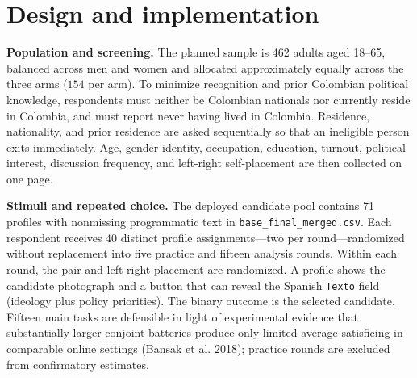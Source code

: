 \documentclass[10pt]{article}
\begin{document}
\section{Design and implementation}

\textbf{Population and screening.} The planned sample is 462 adults aged 18--65, balanced across men and women and allocated approximately equally across the three arms ($154$ per arm). To minimize recognition and prior Colombian political knowledge, respondents must neither be Colombian nationals nor currently reside in Colombia, and must report never having lived in Colombia. Residence, nationality, and prior residence are asked sequentially so that an ineligible person exits immediately. Age, gender identity, occupation, education, turnout, political interest, discussion frequency, and left-right self-placement are then collected on one page.

\textbf{Stimuli and repeated choice.} The deployed candidate pool contains 71 profiles with nonmissing programmatic text in \texttt{base\_final\_merged.csv}. Each respondent receives 40 distinct profile assignments---two per round---randomized without replacement into five practice and fifteen analysis rounds. Within each round, the pair and left-right placement are randomized. A profile shows the candidate photograph and a button that can reveal the Spanish \texttt{Texto} field (ideology plus policy priorities). The binary outcome is the selected candidate. Fifteen main tasks are defensible in light of experimental evidence that substantially larger conjoint batteries produce only limited average satisficing in comparable online settings (Bansak et al. 2018); practice rounds are excluded from confirmatory estimates.
\end{document}
